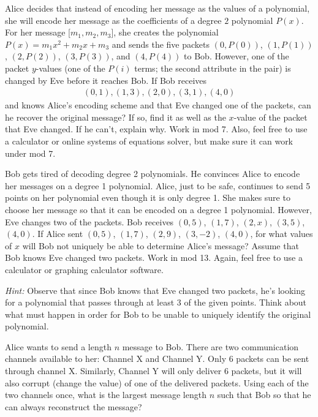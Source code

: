 \documentclass[11pt]{article}
\begin{document}
\begin{Parts}
	\Part Alice decides that instead of encoding her message as the values of a polynomial, she will encode her message as the coefficients of a degree $2$ polynomial $P(x)$. For her message [$m_1, m_2, m_3$], she creates the polynomial $P(x) = m_1x^2 + m_2x + m_3$ and sends the five packets $(0, P(0))$, $(1, P(1))$, $(2, P(2))$, $(3, P(3))$, and $(4, P(4))$ to Bob. However, one of the packet $y$-values (one of the $P(i)$ terms; the second attribute in the pair) is changed by Eve before it reaches Bob. If Bob receives
    	\begin{align*}
      		(0, 1), (1, 3), (2, 0), (3, 1), (4, 0)
    	\end{align*}
    and knows Alice's encoding scheme and that Eve changed one of the packets, can he recover the original message? If so, find it as well as the $x$-value of the packet that Eve changed. If he can't, explain why. Work in mod 7. Also, feel free to use a calculator or online systems of equations solver, but make sure it can work under mod 7.
   
	\Part Bob gets tired of decoding degree 2 polynomials. He convinces Alice to encode her messages on a degree 1 polynomial. Alice, just to be safe, continues to send 5 points on her polynomial even though it is only degree 1. She makes sure to choose her message so that it can be encoded on a degree 1 polynomial. However, Eve changes two of the packets. Bob receives $(0, 5)$, $(1, 7)$, $(2, x)$, $(3, 5)$, $(4, 0)$. If Alice sent $(0, 5)$, $(1, 7)$, $(2, 9)$, $(3, -2)$, $(4, 0)$, for what values of $x$ will Bob not uniquely be able to determine Alice's message? Assume that Bob knows Eve changed two packets. Work in mod 13. Again, feel free to use a calculator or graphing calculator software.

\textit{Hint:} Observe that since Bob knows that Eve changed two packets, he's looking for a polynomial that passes through at least 3 of the given points. Think about what must happen in order for Bob to be unable to uniquely identify the original polynomial.

	\Part
	Alice wants to send a length $n$ message to Bob. There are two communication channels available to her: Channel X and Channel Y. Only 6 packets can be sent through channel X. Similarly, Channel Y will only deliver 6 packets, but it will also corrupt (change the value) of one of the delivered packets. Using each of the two channels once, what is the largest message length $n$ such that Bob so that he can always reconstruct the message? 

\end{Parts}
\end{document}
